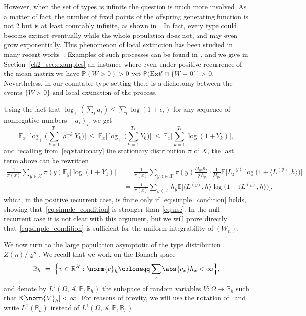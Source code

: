 \begin{refsegment}
\begin{rem}
However, when the set of types is infinite the question is much more involved. As a matter of fact, the number of fixed points of the offspring generating function is not 2 but is at least countably infinite, as shown in~\cite{tan_characterization_2023}.
In fact, every type could become extinct eventually while the whole population does not, and may even grow exponentially. This phenomenon of local extinction has been studied in many recent works~\citep{braunsteins_pathwise_2019,ligonniere_kesten_2024, kyprianou_extinction_2018}. Examples of such processes can be found in~\cite{braunsteins_pathwise_2019}, and we give in Section~\ref{ch2_sec:examples} an instance where even under positive recurrence of the mean matrix we have $\mathbb{P}(W>0)>0$ yet $\mathbb{P}\big(\mathrm{Ext}^c\cap\{W=0\}\big)>0$. 
Nevertheless, in our countable-type setting there is a dichotomy between the events $\{W>0\}$ and local extinction of the process.
\end{rem}

\begin{rem}\label{rem:simple_implies_nsc}
  Using the fact that $\log_+(\sum_i a_i) \leq \sum_i \log(1+a_i)$ for any sequence of nonnegative numbers $(a_i)_i$, we get
  \[
    \mathbb{E}_x\bigg[\log_+\Big(\sum_{k=1}^{T_1}\varrho^{-k} Y_k\Big)\bigg]\ \leq\ \mathbb{E}_x\bigg[\log_+\Big(\sum_{k=1}^{T_1} Y_k\Big)\bigg]\ \leq\ \mathbb{E}_x\bigg[\sum_{k=1}^{T_1}\log(1+Y_k)\bigg],
  \]
  and recalling from~\eqref{eq:stationary} the stationary distribution $\pi$ of $X$, the last term above can be rewritten
  \begin{align*}
    \frac{1}{\pi(x)} \sum_{y\in \mathcal{X}}\pi(y)\mathbb{E}_y\big[\log(1+Y_1)\big]
   \ &=\ \frac{1}{\pi(x)} \sum_{y,z\in \mathcal{X}}\pi(y) \frac{M_{yz}h_z}{\varrho h_y} \cdot \frac{1}{M_{yz}}\mathbb{E}\big[L^{(y)}_z \log\big(1+\langle L^{(y)},h \rangle\big)\Big]\\
   &=\ \frac{1}{\pi(x)} \sum_{y\in \mathcal{X}}\tilde{h}_y \mathbb{E}\Big[\langle L^{(y)},h \rangle \log\big(1+\langle L^{(y)},h \rangle\big)\Big],
  \end{align*}
  which, in the positive recurrent case, is finite only if~\eqref{eq:simple_condition} holds, showing that~\eqref{eq:simple_condition} is stronger than~\eqref{eq:nsc}.
  In the null recurrent case it is not clear with this argument, but we will prove directly that~\eqref{eq:simple_condition} is sufficient for the uniform integrability of $(W_n)$.
\end{rem}

We now turn to the large population asymptotic of the type distribution $Z(n)/\varrho^n$. We recall that we work on the Banach space
\[
  \mathbb{B}_h\ =\ \Big\{v\in \mathbb{R}^{\mathcal{X}} : \norm{v}_{h}
    \coloneqq \sum_x \abs{v_x}h_x < \infty \Big\},
\]
and denote by $L^1(\Omega,\mathcal{A},\mathbb{P},\mathbb{B}_h)$ the subspace of random variables $V:\Omega\to \mathbb{B}_h$ such that $\mathbb{E}[\norm{V}_h]<\infty$. For reasons of brevity, we will use the notation of~\citet[Chapter~1]{pisier_martingales_2016} and write  $L^1(\mathbb{B}_h)$ instead of $L^1(\Omega,\mathcal{A},\mathbb{P},\mathbb{B}_h)$.


\end{refsegment}
